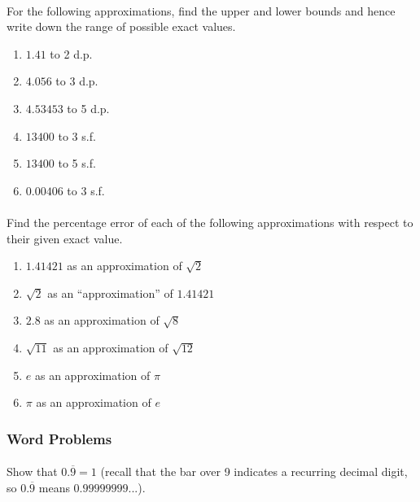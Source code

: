 \documentclass[12pt, a4paper, titlepage, twoside]{article}
\begin{document}
	\paragraph{}
	 For the following approximations, find the upper and lower bounds and hence write down the
	range of possible exact values.
	
	\begin{multicols}{2}
		\begin{enumerate}[label=\textbf{(\alph*)}]
			\item $1.41$ to 2 d.p.
			\item $4.056$ to 3 d.p.
			\item $4.53453$ to 5 d.p.
			\item $13400$ to 3 s.f.
			\item $13400$ to 5 s.f.
			\item $0.00406$ to 3 s.f.
		\end{enumerate}
	\end{multicols}
	
	\paragraph{}
	 Find the percentage error of each of the following approximations with respect to their given exact value.
	
	\begin{multicols}{2}
		\begin{enumerate}[label=\textbf{(\alph*)}]
			\item $1.41421$ as an approximation of $\sqrt{2}$
			\item $\sqrt{2}$ as an ``approximation'' of $1.41421$
			\item $2.8$ as an approximation of $\sqrt{8}$
			\item $\sqrt{11}$ as an approximation of $\sqrt{12}$
			\item $e$ as an approximation of $\pi$
			\item $\pi$ as an approximation of $e$
		\end{enumerate}
	\end{multicols}
	
	\subsubsection*{Word Problems}
	
	\paragraph{}
	 Show that $0.\overline{9}= 1$ (recall that the bar over 9 indicates a recurring decimal digit, so
	$0.\overline{9}$ means $0.99999999...$).
	
\end{document}
